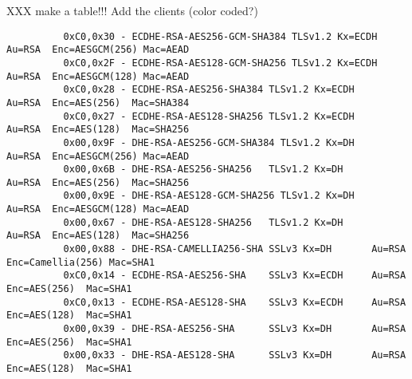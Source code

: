 XXX make a table!!! Add the clients (color coded?)
\begin{verbatim}
          0xC0,0x30 - ECDHE-RSA-AES256-GCM-SHA384 TLSv1.2 Kx=ECDH     Au=RSA  Enc=AESGCM(256) Mac=AEAD
          0xC0,0x2F - ECDHE-RSA-AES128-GCM-SHA256 TLSv1.2 Kx=ECDH     Au=RSA  Enc=AESGCM(128) Mac=AEAD
          0xC0,0x28 - ECDHE-RSA-AES256-SHA384 TLSv1.2 Kx=ECDH     Au=RSA  Enc=AES(256)  Mac=SHA384
          0xC0,0x27 - ECDHE-RSA-AES128-SHA256 TLSv1.2 Kx=ECDH     Au=RSA  Enc=AES(128)  Mac=SHA256
          0x00,0x9F - DHE-RSA-AES256-GCM-SHA384 TLSv1.2 Kx=DH       Au=RSA  Enc=AESGCM(256) Mac=AEAD
          0x00,0x6B - DHE-RSA-AES256-SHA256   TLSv1.2 Kx=DH       Au=RSA  Enc=AES(256)  Mac=SHA256
          0x00,0x9E - DHE-RSA-AES128-GCM-SHA256 TLSv1.2 Kx=DH       Au=RSA  Enc=AESGCM(128) Mac=AEAD
          0x00,0x67 - DHE-RSA-AES128-SHA256   TLSv1.2 Kx=DH       Au=RSA  Enc=AES(128)  Mac=SHA256
          0x00,0x88 - DHE-RSA-CAMELLIA256-SHA SSLv3 Kx=DH       Au=RSA  Enc=Camellia(256) Mac=SHA1
          0xC0,0x14 - ECDHE-RSA-AES256-SHA    SSLv3 Kx=ECDH     Au=RSA  Enc=AES(256)  Mac=SHA1
          0xC0,0x13 - ECDHE-RSA-AES128-SHA    SSLv3 Kx=ECDH     Au=RSA  Enc=AES(128)  Mac=SHA1
          0x00,0x39 - DHE-RSA-AES256-SHA      SSLv3 Kx=DH       Au=RSA  Enc=AES(256)  Mac=SHA1
          0x00,0x33 - DHE-RSA-AES128-SHA      SSLv3 Kx=DH       Au=RSA  Enc=AES(128)  Mac=SHA1
\end{verbatim}





